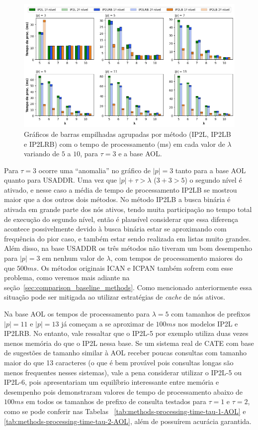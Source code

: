 \begin{figure} [h]
    \centering
    \includegraphics[width=1.0\textwidth]{figures/methods_processing_time_aol_3.png}
    \caption{Gráficos de barras empilhadas agrupadas por método (IP2L, IP2LB e IP2LRB) com o tempo de processamento (ms) em cada valor de $\lambda$ variando de $5$ a $10$, para $\tau=3$ e a base AOL.}
    \label{fig:methods_processing_time_aol_3}
\end{figure}

Para $\tau=3$ ocorre uma ``anomalia'' no gráfico de $|p|=3$ tanto para a base AOL quanto para USADDR. Uma vez que $|p| + \tau > \lambda$ ($3 + 3 > 5$) o segundo nível é ativado, e nesse caso a média de tempo de processamento IP2LB se mostrou maior que a dos outros dois métodos. No método IP2LB a busca binária é ativada em grande parte dos nós ativos, tendo muita participação no tempo total de execução do segundo nível, então é plausível considerar que essa diferença acontece possivelmente devido à busca binária estar se aproximando com frequência do pior caso, e também estar sendo realizada em listas muito grandes. Além disso, na base USADDR os três métodos não tiveram um bom desempenho para $|p|=3$ em nenhum valor de $\lambda$, com tempos de processamento maiores do que $500ms$. Os métodos originais ICAN e ICPAN também sofrem com esse problema, como veremos mais adiante na seção~\ref{sec:comparison_baseline_methods}. Como mencionado anteriormente essa situação pode ser mitigada ao utilizar estratégias de \textit{cache} de nós ativos.

Na base AOL os tempos de processamento para $\lambda=5$ com tamanhos de prefixos $|p|=11$ e $|p|=13$ já começam a se aproximar de $100ms$ nos modelos IP2L e IP2LRB. No entanto, vale ressaltar que o IP2L-5 por exemplo utiliza duas vezes menos memória do que o IP2L nessa base. Se um sistema real de CATE com base de sugestões de tamanho similar à AOL receber poucas consultas com tamanho maior do que 13 caracteres (o que é bem provável pois consultas longas são menos frequentes nesses sistemas), vale a pena considerar utilizar o IP2L-5 ou IP2L-6, pois apresentariam um equilíbrio interessante entre memória e desempenho pois demonstraram valores de tempo de processamento abaixo de $100ms$ em todos os tamanhos de prefixo de consulta testados para $\tau=1$ e $\tau=2$, como se pode conferir nas Tabelas ~\ref{tab:methods-processing-time-tau-1-AOL} e \ref{tab:methods-processing-time-tau-2-AOL}, além de possuírem acurácia garantida.

